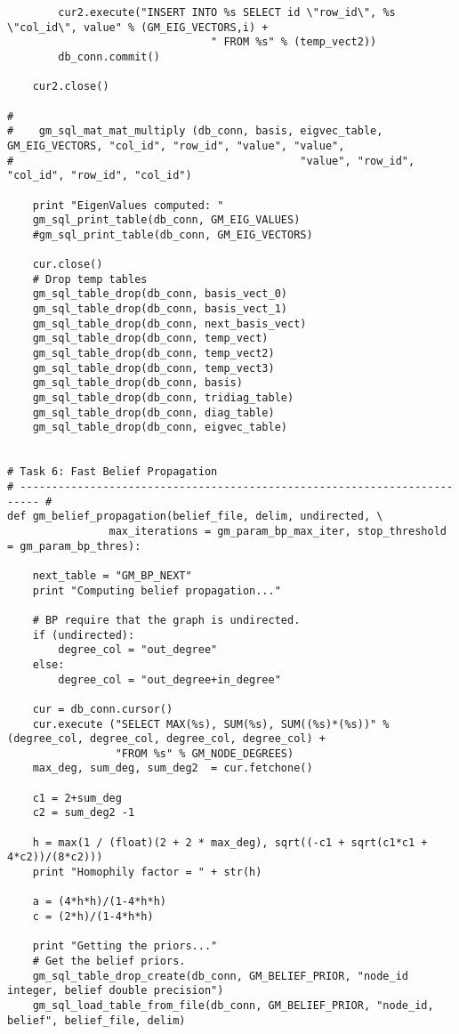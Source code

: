 \begin{lstlisting}
        cur2.execute("INSERT INTO %s SELECT id \"row_id\", %s \"col_id\", value" % (GM_EIG_VECTORS,i) +
                                " FROM %s" % (temp_vect2))
        db_conn.commit()

    cur2.close()

#
#    gm_sql_mat_mat_multiply (db_conn, basis, eigvec_table, GM_EIG_VECTORS, "col_id", "row_id", "value", "value",
#                                             "value", "row_id", "col_id", "row_id", "col_id")

    print "EigenValues computed: "
    gm_sql_print_table(db_conn, GM_EIG_VALUES)
    #gm_sql_print_table(db_conn, GM_EIG_VECTORS)

    cur.close()
    # Drop temp tables
    gm_sql_table_drop(db_conn, basis_vect_0)
    gm_sql_table_drop(db_conn, basis_vect_1)
    gm_sql_table_drop(db_conn, next_basis_vect)
    gm_sql_table_drop(db_conn, temp_vect)
    gm_sql_table_drop(db_conn, temp_vect2)
    gm_sql_table_drop(db_conn, temp_vect3)
    gm_sql_table_drop(db_conn, basis)
    gm_sql_table_drop(db_conn, tridiag_table)
    gm_sql_table_drop(db_conn, diag_table)
    gm_sql_table_drop(db_conn, eigvec_table)


# Task 6: Fast Belief Propagation
# ------------------------------------------------------------------------- #
def gm_belief_propagation(belief_file, delim, undirected, \
                max_iterations = gm_param_bp_max_iter, stop_threshold = gm_param_bp_thres):

    next_table = "GM_BP_NEXT"
    print "Computing belief propagation..."

    # BP require that the graph is undirected.
    if (undirected):
        degree_col = "out_degree"
    else:
        degree_col = "out_degree+in_degree"

    cur = db_conn.cursor()
    cur.execute ("SELECT MAX(%s), SUM(%s), SUM((%s)*(%s))" % (degree_col, degree_col, degree_col, degree_col) +
                 "FROM %s" % GM_NODE_DEGREES)
    max_deg, sum_deg, sum_deg2  = cur.fetchone()

    c1 = 2+sum_deg
    c2 = sum_deg2 -1

    h = max(1 / (float)(2 + 2 * max_deg), sqrt((-c1 + sqrt(c1*c1 + 4*c2))/(8*c2)))
    print "Homophily factor = " + str(h)

    a = (4*h*h)/(1-4*h*h)
    c = (2*h)/(1-4*h*h)

    print "Getting the priors..."
    # Get the belief priors.
    gm_sql_table_drop_create(db_conn, GM_BELIEF_PRIOR, "node_id integer, belief double precision")
    gm_sql_load_table_from_file(db_conn, GM_BELIEF_PRIOR, "node_id, belief", belief_file, delim)


\end{lstlisting}
